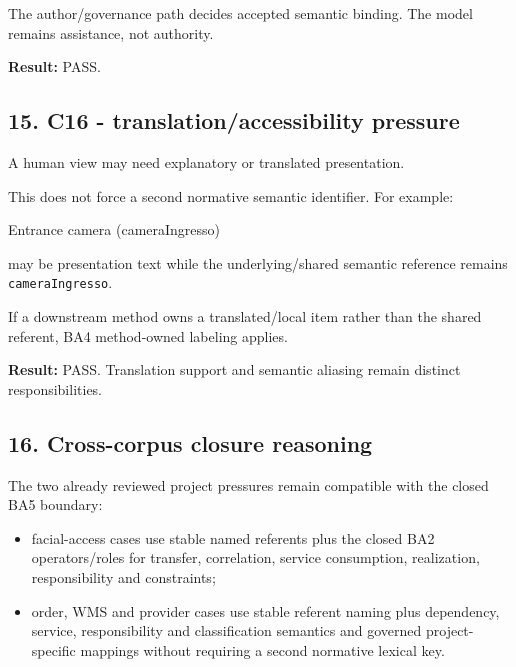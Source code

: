 \documentclass[
  10pt,
  a4paper,
]{article}
\newenvironment{Shaded}{}{}
\newcommand{\NormalTok}[1]{#1}
\providecommand{\tightlist}{%
  \setlength{\itemsep}{0pt}\setlength{\parskip}{0pt}}
\begin{document}
The author/governance path decides accepted semantic binding. The model
remains assistance, not authority.

\textbf{Result:} PASS.

\subsection{15. C16 - translation/accessibility
pressure}\label{15-c16---translationaccessibility-pressure}

A human view may need explanatory or translated presentation.

This does not force a second normative semantic identifier. For example:

\begin{Shaded}
\begin{Highlighting}[]
\NormalTok{Entrance camera (\textasciigrave{}cameraIngresso\textasciigrave{})}
\end{Highlighting}
\end{Shaded}

may be presentation text while the underlying/shared semantic reference
remains \texttt{cameraIngresso}.

If a downstream method owns a translated/local item rather than the
shared referent, BA4 method-owned labeling applies.

\textbf{Result:} PASS. Translation support and semantic aliasing remain
distinct responsibilities.

\subsection{16. Cross-corpus closure
reasoning}\label{16-cross-corpus-closure-reasoning}

The two already reviewed project pressures remain compatible with the
closed BA5 boundary:

\begin{itemize}
\tightlist
\item
  facial-access cases use stable named referents plus the closed BA2
  operators/roles for transfer, correlation, service consumption,
  realization, responsibility and constraints;
\item
  order, WMS and provider cases use stable referent naming plus
  dependency, service, responsibility and classification semantics and
  governed project-specific mappings without requiring a second
  normative lexical key.
\end{itemize}
\end{document}
